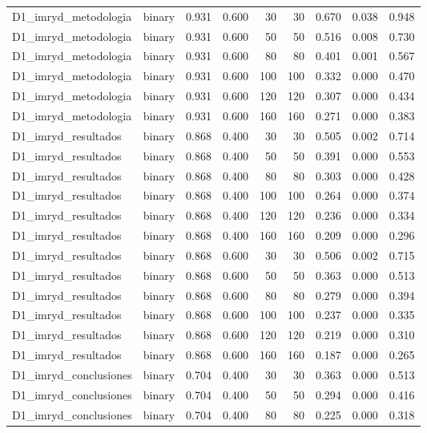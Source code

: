 \begin{table}
{\begin{tabular}{llrrrrrrr}
D1\_imryd\_metodologia & binary & 0.931 & 0.600 & 30 & 30 & 0.670 & 0.038 & 0.948 \\
D1\_imryd\_metodologia & binary & 0.931 & 0.600 & 50 & 50 & 0.516 & 0.008 & 0.730 \\
D1\_imryd\_metodologia & binary & 0.931 & 0.600 & 80 & 80 & 0.401 & 0.001 & 0.567 \\
D1\_imryd\_metodologia & binary & 0.931 & 0.600 & 100 & 100 & 0.332 & 0.000 & 0.470 \\
D1\_imryd\_metodologia & binary & 0.931 & 0.600 & 120 & 120 & 0.307 & 0.000 & 0.434 \\
D1\_imryd\_metodologia & binary & 0.931 & 0.600 & 160 & 160 & 0.271 & 0.000 & 0.383 \\
D1\_imryd\_resultados & binary & 0.868 & 0.400 & 30 & 30 & 0.505 & 0.002 & 0.714 \\
D1\_imryd\_resultados & binary & 0.868 & 0.400 & 50 & 50 & 0.391 & 0.000 & 0.553 \\
D1\_imryd\_resultados & binary & 0.868 & 0.400 & 80 & 80 & 0.303 & 0.000 & 0.428 \\
D1\_imryd\_resultados & binary & 0.868 & 0.400 & 100 & 100 & 0.264 & 0.000 & 0.374 \\
D1\_imryd\_resultados & binary & 0.868 & 0.400 & 120 & 120 & 0.236 & 0.000 & 0.334 \\
D1\_imryd\_resultados & binary & 0.868 & 0.400 & 160 & 160 & 0.209 & 0.000 & 0.296 \\
D1\_imryd\_resultados & binary & 0.868 & 0.600 & 30 & 30 & 0.506 & 0.002 & 0.715 \\
D1\_imryd\_resultados & binary & 0.868 & 0.600 & 50 & 50 & 0.363 & 0.000 & 0.513 \\
D1\_imryd\_resultados & binary & 0.868 & 0.600 & 80 & 80 & 0.279 & 0.000 & 0.394 \\
D1\_imryd\_resultados & binary & 0.868 & 0.600 & 100 & 100 & 0.237 & 0.000 & 0.335 \\
D1\_imryd\_resultados & binary & 0.868 & 0.600 & 120 & 120 & 0.219 & 0.000 & 0.310 \\
D1\_imryd\_resultados & binary & 0.868 & 0.600 & 160 & 160 & 0.187 & 0.000 & 0.265 \\
D1\_imryd\_conclusiones & binary & 0.704 & 0.400 & 30 & 30 & 0.363 & 0.000 & 0.513 \\
D1\_imryd\_conclusiones & binary & 0.704 & 0.400 & 50 & 50 & 0.294 & 0.000 & 0.416 \\
D1\_imryd\_conclusiones & binary & 0.704 & 0.400 & 80 & 80 & 0.225 & 0.000 & 0.318 \\

\end{tabular}}
\end{table}
